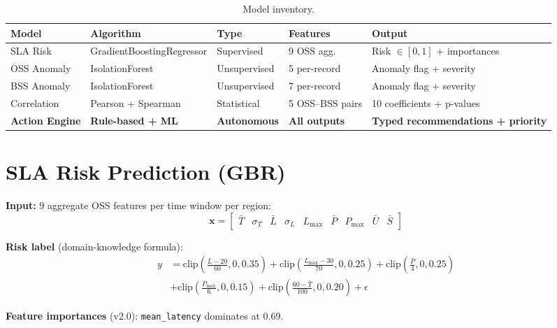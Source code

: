 \documentclass[12pt,a4paper]{report}
\begin{document}
\begin{table}[H]
\centering\small
\caption{Model inventory.}
\begin{tabularx}{\textwidth}{@{}llllX@{}}
\toprule
\textbf{Model} & \textbf{Algorithm} & \textbf{Type} & \textbf{Features} & \textbf{Output} \\
\midrule
SLA Risk     & GradientBoostingRegressor & Supervised   & 9 OSS agg.  & Risk $\in[0,1]$ + importances \\
OSS Anomaly  & IsolationForest           & Unsupervised & 5 per-record & Anomaly flag + severity \\
BSS Anomaly  & IsolationForest           & Unsupervised & 7 per-record & Anomaly flag + severity \\
Correlation  & Pearson + Spearman        & Statistical  & 5 OSS--BSS pairs & 10 coefficients + p-values \\
\midrule
\textbf{Action Engine} & \textbf{Rule-based + ML} & \textbf{Autonomous} & \textbf{All outputs} & \textbf{Typed recommendations + priority} \\
\bottomrule
\end{tabularx}
\end{table}

\section{SLA Risk Prediction (GBR)}

\textbf{Input:} 9 aggregate OSS features per time window per region:
$$\mathbf{x} = \begin{bmatrix} \bar{T} & \sigma_T & \bar{L} & \sigma_L & L_{\max} & \bar{P} & P_{\max} & \bar{U} & \bar{S}\end{bmatrix}$$

\textbf{Risk label} (domain-knowledge formula):
\begin{align*}
y &= \mathrm{clip}\!\left(\tfrac{\bar{L}-20}{60},0,0.35\right)
   + \mathrm{clip}\!\left(\tfrac{L_{\max}-30}{70},0,0.25\right)
   + \mathrm{clip}\!\left(\tfrac{\bar{P}}{4},0,0.25\right)\\
  &+ \mathrm{clip}\!\left(\tfrac{P_{\max}}{6},0,0.15\right)
   + \mathrm{clip}\!\left(\tfrac{60-\bar{T}}{100},0,0.20\right) + \epsilon
\end{align*}

\textbf{Feature importances} (v2.0): \texttt{mean\_latency} dominates at 0.69.
\end{document}
